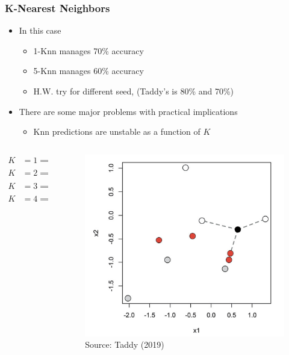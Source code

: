 \documentclass[
  shownotes,
  xcolor={svgnames},
  hyperref={colorlinks,citecolor=DarkBlue,linkcolor=DarkRed,urlcolor=DarkBlue}
  , aspectratio=169]{beamer}
\begin{document}
\begin{frame}[fragile]
\frametitle{K-Nearest Neighbors}
\begin{itemize}
\item In this case
  \begin{itemize}
    \item 1-Knn manages 70\% accuracy
    \item 5-Knn manages 60\% accuracy
    \item H.W. try for different seed, (Taddy's is 80\% and 70\%)
  \end{itemize}
  \item There are some major problems with practical implications
  \medskip
  \begin{itemize}
  \item Knn predictions are unstable as a function of $K$
    \end{itemize}
\end{itemize}
  \begin{columns}[T] %
\begin{column}{.58\textwidth}
\begin{align}
  K&=1 \implies \hat{p}(white)=0 \nonumber \\
  K&=2 \implies \hat{p}(white)=1/2 \nonumber \\
  K&=3 \implies \hat{p}(white)=2/3 \nonumber \\
  K&=4 \implies \hat{p}(white)=1/2 \nonumber 
  \end{align}


\end{column}
\hfill
\begin{column}{.4\textwidth}
\begin{figure}[H] \centering
            \captionsetup{justification=centering}
              \includegraphics[scale=0.1]{figures/knn}
              \\
              \tiny
              Source: Taddy (2019)
 \end{figure}
\end{column}
\end{columns}
  

\end{frame}
\end{document}
